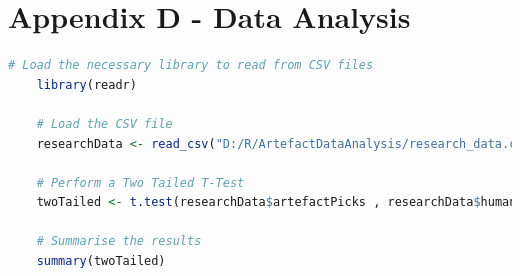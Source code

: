 \section*{Appendix D - Data Analysis} \label{append:d}
\begin{lstlisting}[language=R, caption = Example R code for a Two Tailed T-Test using data from an imported CSV file, captionpos =b]
    # Load the necessary library to read from CSV files
    library(readr)

    # Load the CSV file
    researchData <- read_csv("D:/R/ArtefactDataAnalysis/research_data.csv")

    # Perform a Two Tailed T-Test
    twoTailed <- t.test(researchData$artefactPicks , researchData$humanPicks)

    # Summarise the results
    summary(twoTailed)
\end{lstlisting}


\newpage
